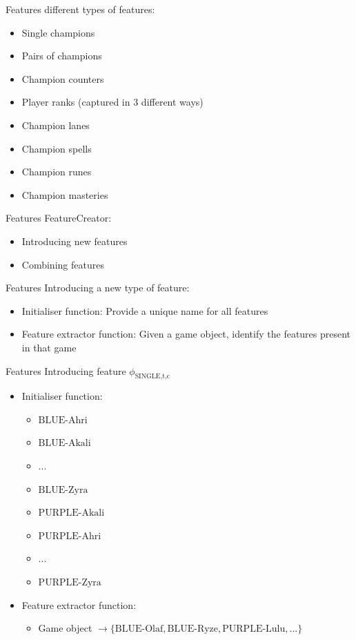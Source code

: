 \begin{frame}{Features}
 different types of features:\\
\begin{itemize}
\item Single champions
\item Pairs of champions
\item Champion counters
\item Player ranks (captured in 3 different ways)
\item Champion lanes
\item Champion spells
\item Champion runes
\item Champion masteries
\end{itemize}
\end{frame}


\begin{frame}{Features}
\centering
FeatureCreator:
\begin{itemize}
\item Introducing new features
\item Combining features
\end{itemize}
\end{frame}

\begin{frame}{Features}
Introducing a new type of feature:
\begin{itemize}
\item Initialiser function: Provide a unique name for all features
\item Feature extractor function: Given a game object, identify the features present in that game
\end{itemize}
\end{frame}

\begin{frame}{Features}
Introducing feature $\phi_\text{SINGLE,t,c}$
\begin{itemize}
\item Initialiser function: 
	\begin{itemize}
	\item $\text{BLUE-Ahri}$
	\item $\text{BLUE-Akali}$
	\item ...
	\item $\text{BLUE-Zyra}$
	\item $\text{PURPLE-Akali}$
	\item $\text{PURPLE-Ahri}$
	\item ...
	\item $\text{PURPLE-Zyra}$
	\end{itemize}
\item Feature extractor function:  
	\begin{itemize}
	\item Game object $\rightarrow \{\text{BLUE-Olaf}, \text{BLUE-Ryze}, \text{PURPLE-Lulu}, ...\}$
	\end{itemize}
\end{itemize}
\end{frame}


